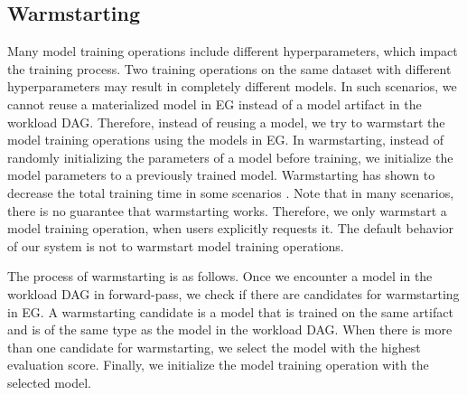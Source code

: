 \subsection{Warmstarting}
Many model training operations include different hyperparameters, which impact the training process.
Two training operations on the same dataset with different hyperparameters may result in completely different models.
In such scenarios, we cannot reuse a materialized model in EG instead of a model artifact in the workload DAG.
Therefore, instead of reusing a model, we try to warmstart the model training operations using the models in EG.
In warmstarting, instead of randomly initializing the parameters of a model before training, we initialize the model parameters to a previously trained model.
Warmstarting has shown to decrease the total training time in some scenarios \cite{baylor2017tfx}.
Note that in many scenarios, there is no guarantee that warmstarting works.
Therefore, we only warmstart a model training operation, when users explicitly requests it.
The default behavior of our system is not to warmstart model training operations.

The process of warmstarting is as follows.
Once we encounter a model in the workload DAG in forward-pass, we check if there are candidates for warmstarting in EG.
A warmstarting candidate is a model that is trained on the same artifact and is of the same type as the model in the workload DAG.
When there is more than one candidate for warmstarting, we select the model with the highest evaluation score.
Finally, we initialize the model training operation with the selected model.